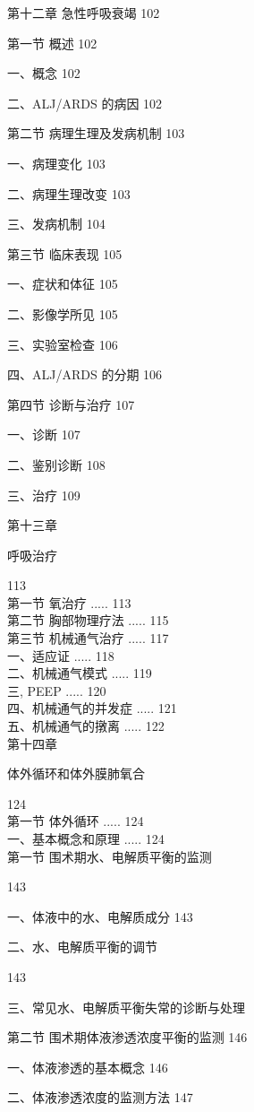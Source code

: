 \documentclass[10pt]{article}
\begin{document}
第十二章 急性呼吸衰竭 102

第一节 概述 102

一、概念 102

二、ALJ/ARDS 的病因 102

第二节 病理生理及发病机制 103

一、病理变化 103

二、病理生理改变 103

三、发病机制 104

第三节 临床表现 105

一、症状和体征 105

二、影像学所见 105

三、实验室检查 106

四、ALJ/ARDS 的分期 106

第四节 诊断与治疗 107

一、诊断 107

二、鉴别诊断 108

三、治疗 109

第十三章

呼吸治疗

113\\
第一节 氧治疗 ..... 113\\
第二节 胸部物理疗法 ..... 115\\
第三节 机械通气治疗 ..... 117\\
一、适应证 ..... 118\\
二、机械通气模式 ..... 119\\
三, PEEP ..... 120\\
四、机械通气的并发症 ..... 121\\
五、机械通气的撴离 ..... 122\\
第十四章

体外循环和体外膜肺氧合

124\\
第一节 体外循环 ..... 124\\
一、基本概念和原理 ..... 124\\
第一节 围术期水、电解质平衡的监测

143

一、体液中的水、电解质成分 143

二、水、电解质平衡的调节

143

三、常见水、电解质平衡失常的诊断与处理

第二节 围术期体液渗透浓度平衡的监测 146

一、体液渗透的基本概念 146

二、体液渗透浓度的监测方法 147
\end{document}
